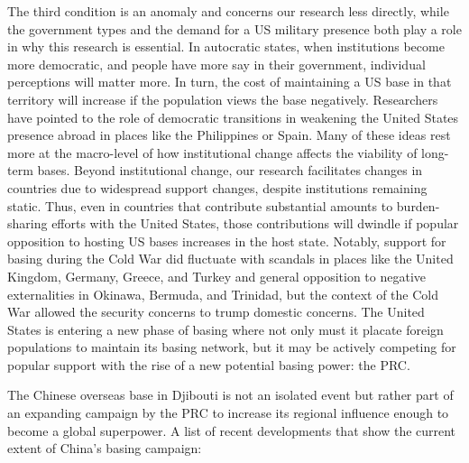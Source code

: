 The third condition is an anomaly and concerns our research less directly, while the government types and the demand for a US military presence both play a role in why this research is essential. In autocratic states, when institutions become more democratic, and people have more say in their government, individual perceptions will matter more. In turn, the cost of maintaining a US base in that territory will increase if the population views the base negatively. Researchers have pointed to the role of democratic transitions in weakening the United States presence abroad in places like the Philippines or Spain.\autocite{calder2007,Cooley2008} Many of these ideas rest more at the macro-level of how institutional change affects the viability of long-term bases. Beyond institutional change, our research facilitates changes in countries due to widespread support changes, despite institutions remaining static. Thus, even in countries that contribute substantial amounts to burden-sharing efforts with the United States, those contributions will dwindle if popular opposition to hosting US bases increases in the host state. Notably, support for basing during the Cold War did fluctuate with scandals in places like the United Kingdom, Germany, Greece, and Turkey and general opposition to negative externalities in Okinawa, Bermuda, and Trinidad, but the context of the Cold War allowed the security concerns to trump domestic concerns.\autocite{cottrellmoorer1977,high2008} The United States is entering a new phase of basing where not only must it placate foreign populations to maintain its basing network, but it may be actively competing for popular support with the rise of a new potential basing power: the PRC. 

The Chinese overseas base in Djibouti is not an isolated event but rather part of an expanding campaign by the PRC to increase its regional influence enough to become a global superpower. A list of recent developments that show the current extent of China's basing campaign:


